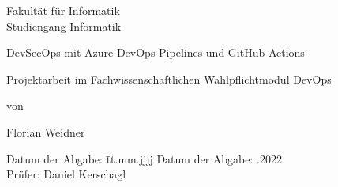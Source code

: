 \begin{titlepage}

\sffamily

\raggedleft

\vspace*{-2cm}


\vfill

\centering
\LARGE
Fakultät für Informatik  \vspace{0.5cm}\\
\Large
Studiengang Informatik

\vspace{2cm}

\LARGE

DevSecOps mit Azure DevOps Pipelines und GitHub Actions

\vspace{2cm}

\Large
Projektarbeit im Fachwissenschaftlichen Wahlpflichtmodul DevOps

\vspace{1.5cm}


\Large
von

\vspace{0.5cm}


\LARGE
Florian Weidner \vspace{1cm}

\vspace{1cm}

\flushleft
 \Large
\vspace*{\fill}

\begin{tabbing}
Datum der Abgabe: \= tt.mm.jjjj \kill
Datum der Abgabe: .2022 \\
Prüfer: \> Daniel Kerschagl \\

\end{tabbing}

\end{titlepage}
